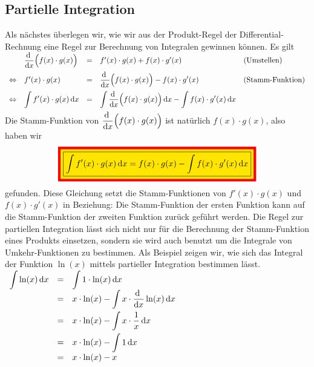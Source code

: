 \subsection{Partielle Integration}
Als n\"achstes \"uberlegen wir, wie wir aus der Produkt-Regel der Differential-Rechnung
eine Regel zur Berechnung von Integralen gewinnen k\"onnen.  Es gilt
\\[0.2cm]
$
\begin{array}[t]{llcll}
                & \displaystyle\frac{\textrm{d}\;}{\textrm{d}x} \Bigl(f(x)\cdot g(x)\Bigr)  & = & f'(x)\cdot  g(x) + f(x) \cdot  g'(x) &\mbox{(Umstellen)} \\[0.3cm]
\Leftrightarrow & f'(x) \cdot  g(x) & = & \displaystyle\frac{\textrm{d}\;}{\textrm{d}x} \Bigl(f(x)\cdot g(x)\Bigr) - f(x) \cdot  g'(x) &\mbox{(Stamm-Funktion)} \\[0.3cm]
\Leftrightarrow & \displaystyle \int f'(x)\cdot  g(x)\,\textrm{d} x & = & \displaystyle\int\displaystyle\frac{\textrm{d}\;}{\textrm{d}x} \Bigl(f(x)\cdot g(x)\Bigr)\,\textrm{d} x - \int f(x) \cdot  g'(x)\,\textrm{d} x \\[0.3cm]
\end{array}
$
\\[0.2cm]
Die Stamm-Funktion von $\displaystyle\frac{\textrm{d}\;}{\textrm{d}x}\Bigl( f(x)\cdot g(x) \Bigr)$ ist nat\"urlich $f(x)\cdot g(x)$, also haben wir
\begin{equation}
  \label{eq:partInt0}
 \colorbox{red}{\colorbox{orange}{\framebox{$\ds\int f'(x)\cdot  g(x)\,\dr x =  \ds f(x)\cdot g(x) - \int f(x) \cdot  g'(x)\,\dr x$}}}
\end{equation}
gefunden. Diese Gleichung setzt die Stamm-Funktionen von $f'(x)\cdot  g(x)$
und $f(x) \cdot  g'(x)$ in Beziehung: Die Stamm-Funktion der ersten Funktion kann auf die
Stamm-Funktion der zweiten Funktion zur\"uck gef\"uhrt werden.
Die Regel zur partiellen Integration l\"asst sich nicht nur f\"ur die Berechnung der
Stamm-Funktion eines Produkts einsetzen, sondern sie wird auch benutzt um die Integrale von
Umkehr-Funktionen zu bestimmen.  Als Beispiel zeigen wir, wie sich das Integral der 
Funktion $\ln(x)$ mittels partieller Integration bestimmen l\"asst.
\\[0.3cm]
\hspace*{1.3cm}
$
\begin{array}[t]{lcl}
 \displaystyle\int\ln(x)\,\textrm{d} x & = &  \displaystyle\int1\cdot \ln(x)\,\textrm{d} x \\[0.2cm]
                 & = &  x\cdot \ln(x) - \displaystyle\int x\cdot \displaystyle\frac{\textrm{d}\;}{\textrm{d}x} \ln(x)\,\textrm{d} x \\[0.3cm]
                 & = &  x\cdot \ln(x) - \displaystyle\int x\cdot \frac{1}{x}\,\textrm{d} x \\[0.3cm]
                 & = &  x\cdot \ln(x) - \displaystyle\int 1\,\textrm{d} x \\[0.2cm]
                 & = &  x\cdot \ln(x) - x \\[0.2cm]
\end{array}
$

